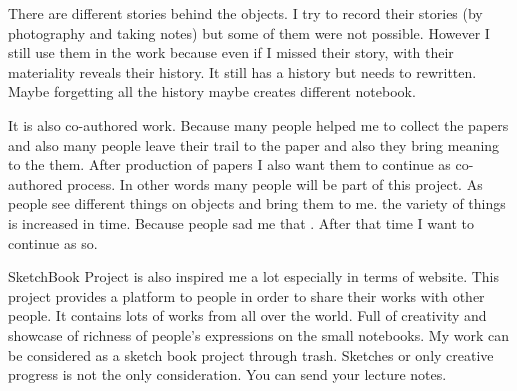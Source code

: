 There are different stories behind the objects. I try to record their stories (by photography and taking notes) but some of them were not possible. However I still use them in the work because even if I missed their story, with their materiality reveals their history. It still has a history but needs to rewritten. Maybe forgetting all the history maybe creates different notebook.

It is also co-authored work. Because many people helped me to collect the papers and also many people leave their trail to the paper and also they bring meaning to the them. After production of papers I also want them to continue as co-authored process. In other words many people will be part of this project. As people see different things on objects and bring them to me. the variety of things is increased in time. Because people sad me that . After that time I want to continue as so. 

SketchBook Project is also inspired me a lot especially in terms of website. This project provides a platform to people in order to share their works with other people. It contains lots of works from all over the world. Full of creativity and showcase of richness of people's expressions on the small notebooks. My work can be considered as a sketch book project through trash. Sketches or only creative progress is not the only consideration. You can send your lecture notes. 





